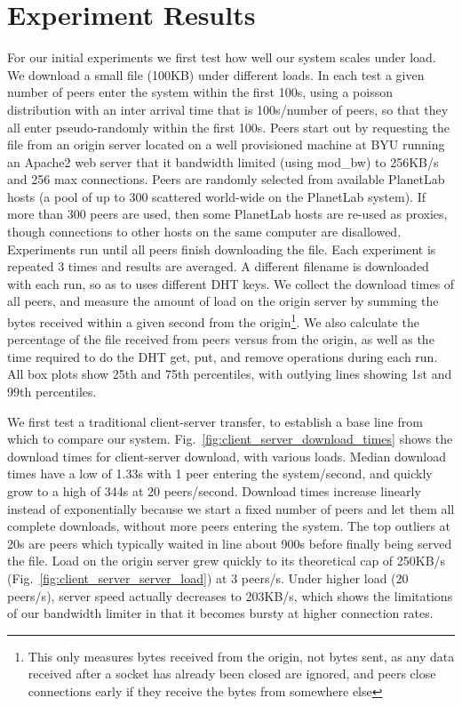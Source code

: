 
\section{Experiment Results}
For our initial experiments we first test how well our system scales under load. We download a small file (100KB) 
under different loads. In each test a given number of peers enter the system within 
the first 100s, using a poisson distribution with an inter arrival time that is 100s/number of peers, 
so that they all enter pseudo-randomly within the first 100s. Peers start out by requesting the file from 
an origin server located on a well provisioned machine at BYU running an Apache2 web server that it 
bandwidth limited (using mod\_bw) to 256KB/s and 256 max connections. Peers are randomly selected from available PlanetLab 
hosts (a pool of up to 300 scattered world-wide on the PlanetLab system).  If more than 300 peers are used,
then some PlanetLab hosts are re-used as proxies, though connections to other hosts on the same computer
are disallowed.  Experiments run until 
all peers finish downloading the file. Each experiment is repeated 3 times and results are averaged. 
A different filename is downloaded with each run, so as to uses different DHT keys. We collect the download 
times of all peers, and measure the amount of load on the origin server by summing the bytes received within a given 
second from the origin\footnote{This only measures bytes received from the origin, not bytes sent, 
as any data received after a socket has already been closed are ignored, and peers 
close connections early if they receive the bytes from somewhere else}. We also calculate the percentage 
of the file received from peers versus from the origin, as well as the time required to do the DHT 
get, put, and remove operations during each run.  All box plots show 25th and 75th percentiles, with outlying lines showing
1st and 99th percentiles.

We first test a traditional client-server transfer, to establish a base line from which to compare 
our system. Fig.~\ref{fig:client_server_download_times} shows the download times for client-server 
download, with various loads. Median download times have a low of 1.33s with 1 peer entering the system/second, 
and quickly grow to a high of 344s at 20 peers/second. Download times increase linearly instead 
of exponentially because we start a fixed number of peers and let them all complete downloads, without more peers
entering the system. 
The top outliers at 20s are peers which typically waited in line about 900s before finally 
being served the file. Load on the origin server grew quickly to its theoretical cap of 250KB/s (Fig.~\ref{fig:client_server_server_load}) 
at 3 peers/s. Under higher load (20 peers/s), server speed actually decreases to 203KB/s, which 
shows the limitations of our bandwidth limiter in that it becomes bursty at higher connection rates. 

